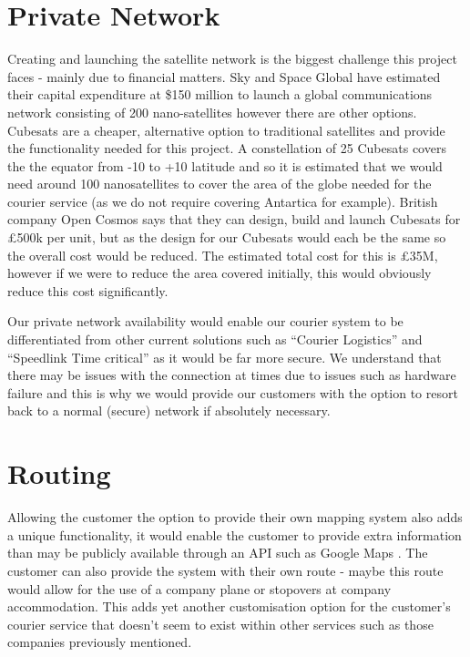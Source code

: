 


\section{Private Network}

Creating and launching the satellite network is the biggest challenge this project faces - mainly due to financial matters. Sky and Space Global have estimated their capital expenditure at \$150 million to launch a global communications network consisting of 200 nano-satellites \cite{nanosatcost} however there are other options. Cubesats \cite{cubsesat} are a cheaper, alternative option to traditional satellites and provide the functionality needed for this project. A constellation of 25 Cubesats covers the the equator from -10 to +10 latitude \cite{narayanasamy2017nanosatellites} and so it is estimated that we would need around 100 nanosatellites to cover the area of the globe needed for the courier service (as we do not require covering Antartica for example). British company Open Cosmos says that they can design, build and launch Cubesats for £500k per unit, but as the design for our Cubesats would each be the same so the overall cost would be reduced. The estimated total cost for this is £35M, however if we were to reduce the area covered initially, this would obviously reduce this cost significantly.

Our private network availability would enable our courier system to be differentiated from other current solutions such as “Courier Logistics” \cite{courierlogistics_2019} and “Speedlink Time critical” \cite{speedlinktc} as it would be far more secure. We understand that there may be issues with the connection at times due to issues such as hardware failure and this is why we would provide our customers with the option to resort back to a normal (secure) network if absolutely necessary. 

\section{Routing}

Allowing the customer the option to provide their own mapping system also adds a unique functionality, it would enable the customer to provide extra information than may be publicly available through an API such as Google Maps \cite{GoogleMaps}. The customer can also provide the system with their own route - maybe this route would allow for the use of a company plane or stopovers at company accommodation. This adds yet another customisation option for the customer's courier service that doesn't seem to exist within other services such as those companies previously mentioned.

